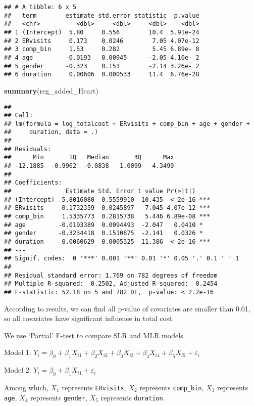 \documentclass[]{article}
\newenvironment{Shaded}{\begin{snugshade}}{\end{snugshade}}
\newcommand{\KeywordTok}[1]{\textcolor[rgb]{0.13,0.29,0.53}{\textbf{#1}}}
\newcommand{\NormalTok}[1]{#1}
\begin{document}
\begin{verbatim}
## # A tibble: 6 x 5
##   term        estimate std.error statistic  p.value
##   <chr>          <dbl>     <dbl>     <dbl>    <dbl>
## 1 (Intercept)  5.80     0.556        10.4  5.91e-24
## 2 ERvisits     0.173    0.0246        7.05 4.07e-12
## 3 comp_bin     1.53     0.282         5.45 6.89e- 8
## 4 age         -0.0193   0.00945      -2.05 4.10e- 2
## 5 gender      -0.323    0.151        -2.14 3.26e- 2
## 6 duration     0.00606  0.000533     11.4  6.76e-28
\end{verbatim}

\begin{Shaded}
\begin{Highlighting}[]
\KeywordTok{summary}\NormalTok{(reg_added_Heart)}
\end{Highlighting}
\end{Shaded}

\begin{verbatim}
## 
## Call:
## lm(formula = log_totalcost ~ ERvisits + comp_bin + age + gender + 
##     duration, data = .)
## 
## Residuals:
##      Min       1Q   Median       3Q      Max 
## -12.1885  -0.9962  -0.0838   1.0099   4.3499 
## 
## Coefficients:
##               Estimate Std. Error t value Pr(>|t|)    
## (Intercept)  5.8016080  0.5559910  10.435  < 2e-16 ***
## ERvisits     0.1732359  0.0245897   7.045 4.07e-12 ***
## comp_bin     1.5335773  0.2815738   5.446 6.89e-08 ***
## age         -0.0193389  0.0094493  -2.047   0.0410 *  
## gender      -0.3234418  0.1510875  -2.141   0.0326 *  
## duration     0.0060629  0.0005325  11.386  < 2e-16 ***
## ---
## Signif. codes:  0 '***' 0.001 '**' 0.01 '*' 0.05 '.' 0.1 ' ' 1
## 
## Residual standard error: 1.769 on 782 degrees of freedom
## Multiple R-squared:  0.2502, Adjusted R-squared:  0.2454 
## F-statistic: 52.18 on 5 and 782 DF,  p-value: < 2.2e-16
\end{verbatim}

According to results, we can find all p-value of covariates are smaller
than 0.01, so all covariates have significant influence in total cost.

We use `Partial' F-test to compare SLR and MLR models.

Model 1:
\(Y_i = \beta_0 + \beta_1X_{i1} + \beta_2X_{i2} + \beta_3X_{i3} + \beta_4X_{i4} + \beta_5X_{i5} + \varepsilon_i\)

Model 2: \(Y_i = \beta_0 + \beta_1X_{i1} + \varepsilon_i\)

Among which, \(X_1\) represents \texttt{ERvisits}, \(X_2\) represents
\texttt{comp\_bin}, \(X_3\) represents \texttt{age}, \(X_4\) represents
\texttt{gender}, \(X_5\) represents \texttt{duration}.
\end{document}
